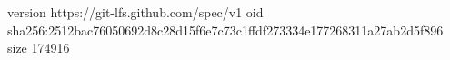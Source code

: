 version https://git-lfs.github.com/spec/v1
oid sha256:2512bac76050692d8c28d15f6e7c73c1ffdf273334e177268311a27ab2d5f896
size 174916
